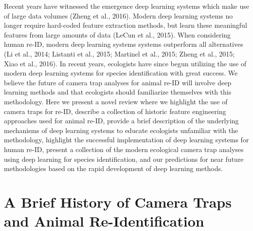 \documentclass[11pt]{article}
\begin{document}
Recent years have witnessed the emergence deep learning systems which make use of large data volumes (Zheng et al., 2016). Modern deep learning systems no longer require hard-coded feature extraction methods, but learn these meaningful features from large amounts of data (LeCun et al., 2015). When considering human re-ID, modern deep learning systems systems outperform all alternatives (Li et al., 2014; Listanti et al., 2015; Martinel et al., 2015; Zheng et al., 2015; Xiao et al., 2016). In recent years, ecologists have since begun utilizing the use of modern deep learning systems for species identification with great success. We believe the future of camera trap analyses for animal re-ID will involve deep learning methods and that ecologists should familiarize themselves with this methodology. Here we present a novel review where we highlight the use of camera traps for re-ID, describe a collection of historic feature engineering approaches used for animal re-ID, provide a brief description of the underlying mechanisms of deep learning systems to educate ecologists unfamiliar with the methodology, highlight the successful implementation of deep learning systems for human re-ID, present a collection of the modern ecological camera trap analyses using deep learning for species identification, and our predictions for near future methodologies based on the rapid development of deep learning methods.
\newline
\\

\section*{A Brief History of Camera Traps and Animal Re-Identification}
\end{document}
